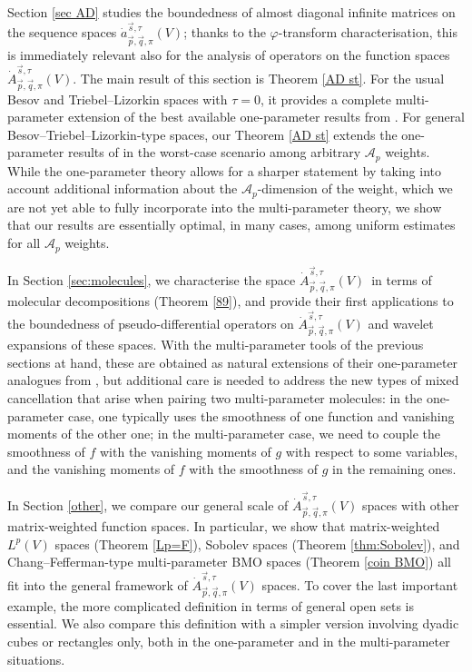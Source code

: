 \documentclass[11pt, reqno]{amsart}
\theoremstyle{definition}
\theoremstyle{remark}
\numberwithin{equation}{section}
\newcommand{\A}{\mathscr A}
\newcommand{\vp}{\vec p}
\newcommand{\vq}{\vec q}
\newcommand{\vs}{\vec s}
\newcommand{\Atau}{\dot A^{\vs,\tau}_{\vp,\vq,\pi}}
\newcommand{\atau}{\dot a^{\vs,\tau}_{\vp,\vq,\pi}}
\begin{document}
Section \ref{sec AD} studies the boundedness of almost diagonal infinite matrices on the sequence spaces $\atau(V)$; thanks to the $\varphi$-transform characterisation, this is immediately relevant also for the analysis of operators on the function spaces $\Atau(V)$. The main result of this section is Theorem \ref{AD st}. For the usual Besov and Triebel--Lizorkin spaces with $\tau=0$, it provides a complete multi-parameter extension of the best available one-parameter results from \cite{BHYY:1b}. For general Besov--Triebel--Lizorkin-type spaces, our Theorem \ref{AD st} extends the one-parameter results of \cite{BHYY:1b} in the worst-case scenario among arbitrary $\A_p$ weights. While the one-parameter theory allows for a sharper statement by taking into account additional information about the $\A_p$-dimension of the weight, which we are not yet able to fully incorporate into the multi-parameter theory, we show that our results are essentially optimal, in many cases, among uniform estimates for all $\A_p$ weights.

In Section \ref{sec:molecules}, we characterise the space $\Atau(V)$ in terms of molecular decompositions (Theorem \ref{89}), and provide their first applications to the boundedness of pseudo-differential operators on $\Atau(V)$ and wavelet expansions of these spaces. With the multi-parameter tools of the previous sections at hand, these are obtained as natural extensions of their one-parameter analogues from \cite{BHYY:1c}, but additional care is needed to address the new types of mixed cancellation that arise when pairing two multi-parameter molecules: in the one-parameter case, one typically uses the smoothness of one function and vanishing moments of the other one; in the multi-parameter case, we need to couple the smoothness of $f$ with the vanishing moments of $g$ with respect to some variables, and the vanishing moments of $f$ with the smoothness of $g$ in the remaining ones.

In Section \ref{other}, we compare our general scale of $\Atau(V)$ spaces with other matrix-weighted function spaces. In particular, we show that matrix-weighted $L^p(V)$ spaces (Theorem \ref{Lp=F}), Sobolev spaces (Theorem \ref{thm:Sobolev}), and Chang--Fefferman-type multi-parameter BMO spaces (Theorem \ref{coin BMO}) all fit into the general framework of $\Atau(V)$ spaces. To cover the last important example, the more complicated definition in terms of general open sets is essential. We also compare this definition with a simpler version involving dyadic cubes or rectangles only, both in the one-parameter and in the multi-parameter situations.
\end{document}
